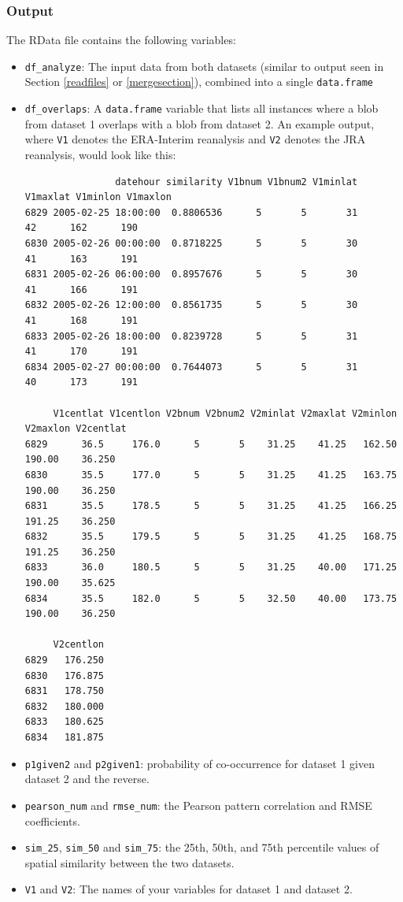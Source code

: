 \documentclass{article}
\begin{document}
\subsubsection{Output}

The RData file contains the following variables:
\begin{itemize}
\item \texttt{df\_analyze}: The input data from both datasets (similar to output seen in Section \ref{readfiles} or \ref{mergesection}), combined into a single \texttt{data.frame}
\item \texttt{df\_overlaps}: A \texttt{data.frame} variable that lists all instances where a blob from dataset 1 overlaps with a blob from dataset 2. An example output, where \texttt{V1} denotes the ERA-Interim reanalysis and \texttt{V2} denotes the JRA reanalysis, would look like this:
\begin{verbatim}
                datehour similarity V1bnum V1bnum2 V1minlat V1maxlat V1minlon V1maxlon
6829 2005-02-25 18:00:00  0.8806536      5       5       31       42      162      190
6830 2005-02-26 00:00:00  0.8718225      5       5       30       41      163      191
6831 2005-02-26 06:00:00  0.8957676      5       5       30       41      166      191
6832 2005-02-26 12:00:00  0.8561735      5       5       30       41      168      191
6833 2005-02-26 18:00:00  0.8239728      5       5       31       41      170      191
6834 2005-02-27 00:00:00  0.7644073      5       5       31       40      173      191

     V1centlat V1centlon V2bnum V2bnum2 V2minlat V2maxlat V2minlon V2maxlon V2centlat
6829      36.5     176.0      5       5    31.25    41.25   162.50   190.00    36.250
6830      35.5     177.0      5       5    31.25    41.25   163.75   190.00    36.250
6831      35.5     178.5      5       5    31.25    41.25   166.25   191.25    36.250
6832      35.5     179.5      5       5    31.25    41.25   168.75   191.25    36.250
6833      36.0     180.5      5       5    31.25    40.00   171.25   190.00    35.625
6834      35.5     182.0      5       5    32.50    40.00   173.75   190.00    36.250

     V2centlon
6829   176.250
6830   176.875
6831   178.750
6832   180.000
6833   180.625
6834   181.875
\end{verbatim}
\item \texttt{p1given2} and \texttt{p2given1}: probability of co-occurrence for dataset 1 given dataset 2 and the reverse.
\item \texttt{pearson\_num} and \texttt{rmse\_num}: the Pearson pattern correlation and RMSE coefficients.
\item \texttt{sim\_25}, \texttt{sim\_50} and \texttt{sim\_75}: the 25th, 50th, and 75th percentile values of spatial similarity between the two datasets.
\item \texttt{V1} and \texttt{V2}: The names of your variables for dataset 1 and dataset 2.
\end{itemize}
\end{document}
